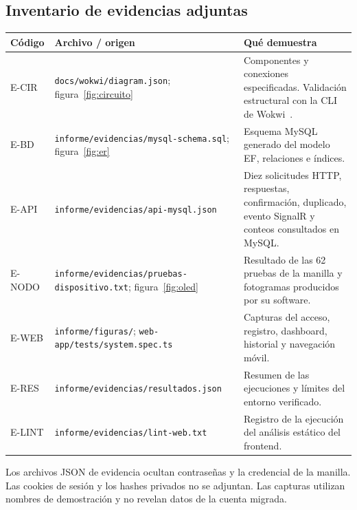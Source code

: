 \documentclass[10pt,a4paper]{article}
\newcommand{\code}[1]{{\small\urlstyle{tt}\nolinkurl{#1}}}
\begin{document}
\clearpage
\subsection{Inventario de evidencias adjuntas}
\label{sec:evidencias}
\begin{longtable}{@{}P{21mm}P{58mm}P{73mm}@{}}
\toprule\textbf{Código} & \textbf{Archivo / origen} & \textbf{Qué demuestra}\\\midrule\endhead
E-CIR & \code{docs/wokwi/diagram.json}; figura~\ref{fig:circuito} & Componentes y conexiones especificadas. Validación estructural con la CLI de Wokwi~\cite{wokwi}.\\
E-BD & \code{informe/evidencias/mysql-schema.sql}; figura~\ref{fig:er} & Esquema MySQL generado del modelo EF, relaciones e índices.\\
E-API & \code{informe/evidencias/api-mysql.json} & Diez solicitudes HTTP, respuestas, confirmación, duplicado, evento SignalR y conteos consultados en MySQL.\\
E-NODO & \code{informe/evidencias/pruebas-dispositivo.txt}; figura~\ref{fig:oled} & Resultado de las 62 pruebas de la manilla y fotogramas producidos por su software.\\
E-WEB & \code{informe/figuras/}; \code{web-app/tests/system.spec.ts} & Capturas del acceso, registro, dashboard, historial y navegación móvil.\\
E-RES & \code{informe/evidencias/resultados.json} & Resumen de las ejecuciones y límites del entorno verificado.\\
E-LINT & \code{informe/evidencias/lint-web.txt} & Registro de la ejecución del análisis estático del frontend.\\\bottomrule
\end{longtable}

Los archivos JSON de evidencia ocultan contraseñas y la credencial de la manilla. Las cookies de sesión y los hashes privados no se adjuntan. Las capturas utilizan nombres de demostración y no revelan datos de la cuenta migrada.
\end{document}
